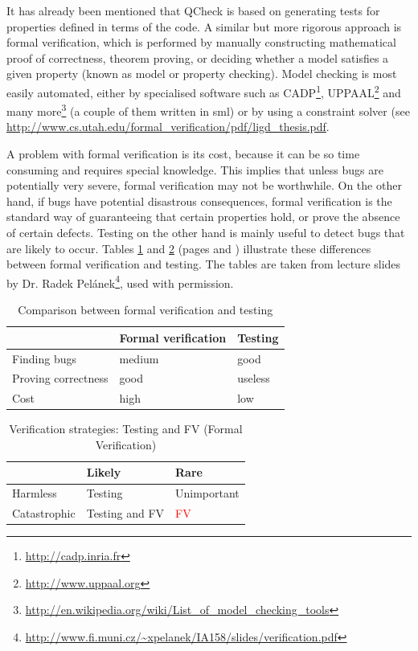 \documentclass[11pt]{article}
\begin{document}
It has already been mentioned that QCheck is based on generating tests for properties defined in terms of the code. A similar but more rigorous approach is formal verification, which is performed by manually constructing mathematical proof of correctness, theorem proving, or deciding whether a model satisfies a given property (known as model or property checking). Model checking is most easily automated, either by specialised software such as CADP\footnote{\url{http://cadp.inria.fr}}, UPPAAL\footnote{\url{http://www.uppaal.org}} and many more\footnote{\url{http://en.wikipedia.org/wiki/List_of_model_checking_tools}} (a couple of them written in \gls{sml}) or by using a constraint solver (see \url{http://www.cs.utah.edu/formal\_verification/pdf/ligd\_thesis.pdf}. %

A problem with formal verification is its cost, because it can be so time consuming and requires special knowledge. This implies that unless bugs are potentially very severe, formal verification may not be worthwhile. On the other hand, if bugs have potential disastrous consequences, formal verification is the standard way of guaranteeing that certain properties hold, or prove the absence of certain defects. Testing on the other hand is mainly useful to detect bugs that are likely to occur. Tables \ref{tab:fvt} and \ref{tab:fvt2} (pages \pageref{tab:fvt} and \pageref{tab:fvt2}) illustrate these differences between formal verification and testing. The tables are taken from lecture slides by Dr. Radek Pelánek\footnote{\url{http://www.fi.muni.cz/~xpelanek/IA158/slides/verification.pdf}}, used with permission.

\begin{table}
  \centering
    \begin{tabular}{ l | l l}
    & Formal verification & Testing \\ \hline
    Finding bugs & medium & good \\
    Proving correctness & good & useless \\
    Cost & high & low \\
    \end{tabular}
  \caption{Comparison between formal verification and testing}
  \label{tab:fvt}
\end{table}

\begin{table}
  \centering
    \begin{tabular}{ l | l l}
    & Likely & Rare \\ \hline
    Harmless & Testing & Unimportant \\
    Catastrophic & Testing and FV & \textcolor{red}{FV} \\
    \end{tabular}
  \caption{Verification strategies: Testing and FV (Formal Verification)}
  \label{tab:fvt2}
\end{table}
\end{document}
